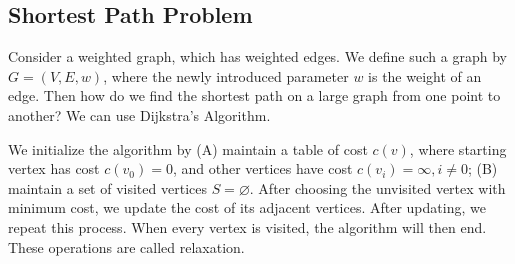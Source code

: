 \subsection{Shortest Path Problem}
Consider a weighted graph, which has weighted edges. We define such a graph by \(G = (V, E, w)\), where the newly introduced parameter \(w\) is the weight of an edge. Then how do we find the shortest path on a large graph from one point to another? We can use Dijkstra's Algorithm. 

We initialize the algorithm by (A) maintain a table of cost \(c(v)\), where starting vertex has cost \(c(v_0) = 0\), and other vertices have cost \(c(v_i) = \infty, i \neq 0\); (B) maintain a set of visited vertices \(S = \varnothing\). After choosing the unvisited vertex with minimum cost, we update the cost of its adjacent vertices. After updating, we repeat this process. When every vertex is visited, the algorithm will then end. These operations are called relaxation.

